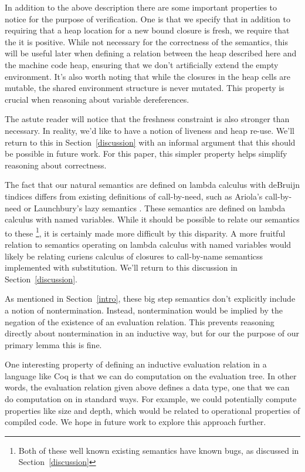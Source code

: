 In addition to the above description there are some important properties to
notice for the purpose of verification. One is that we specify that in addition
to requiring that a heap location for a new bound closure is fresh, we require
that the it is positive. While not necessary for the correctness of the
semantics, this will be useful later when defining a relation between the heap
described here and the machine code heap, ensuring that we don't artificially
extend the empty environment. It's also worth noting that while the closures in
the heap cells are mutable, the shared environment structure is never mutated.
This property is crucial when reasoning about variable dereferences. 

The astute reader will notice that the freshness constraint is also stronger
than necessary. In reality, we'd like to have a notion of liveness and heap
re-use.  We'll return to this in Section~\ref{discussion} with an informal
argument that this should be possible in future work. For this paper, this
simpler property helps simplify reasoning about correctness.  

The fact that our natural semantics are defined on lambda calculus with deBruijn
tindices differs from existing definitions of call-by-need, such as Ariola's
call-by-need \cite{ariola} or Launchbury's lazy semantics \cite{launchbury}.
These semantics are defined on lambda calculus with named variables. While it
should be possible to relate our semantics to these \footnote{Both of these well
known existing semantics have known bugs, as discussed in
Section~\ref{discussion}}, it is certainly made more difficult by this
disparity. A more fruitful relation to semantics operating on lambda calculus
with named variables would likely be relating curiens calculus of closures to
call-by-name semanticss implemented with substitution. We'll return to this
discussion in Section~\ref{discussion}.

As mentioned in Section~\ref{intro}, these big step semantics don't explicitly
include a notion of nontermination. Instead, nontermination would be implied by
the negation of the existence of an evaluation relation. This prevents reasoning
directly about nontermination in an inductive way, but for our the purpose of
our primary lemma this is fine. 

One interesting property of defining an inductive evaluation relation in a
language like Coq is that we can do computation on the evaluation tree. In other
words, the evaluation relation given above defines a data type, one that we can
do computation on in standard ways. For example, we could potentially compute
properties like size and depth, which would be related to operational properties
of compiled code. We hope in future work to explore this approach further.

